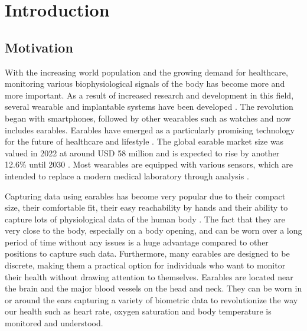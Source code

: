 \chapter{Introduction}
\label{ch:Introduction}

\section{Motivation}
\label{ch:Introduction:Motivation}
With the increasing world population and the growing demand for healthcare, monitoring various biophysiological signals of the body has become more and more important. 
As a result of increased research and development in this field, several wearable and implantable systems have been developed \cite{loncar-turukaloLiteratureWearableTechnology2019}.
The revolution began with smartphones, followed by other wearables such as watches and now includes earables.
Earables have emerged as a particularly promising technology for the future of healthcare and lifestyle \cite{trespGoingDigitalSurvey2016, kirkWearablesRevolutionStandardization2014a}. 
The global earable market size was valued in 2022 at around USD 58 million and is expected to rise by another 12.6\% until 2030 \cite{GlobalEarphonesHeadphones2018}.
Most wearables are equipped with various sensors, which are intended to replace a modern medical laboratory through analysis \cite{loncar-turukaloLiteratureWearableTechnology2019}.

Capturing data using earables has become very popular due to their compact size, their comfortable fit, their easy reachability by hands and their ability to capture lots of physiological data of the human body \cite{roddigerSensingEarablesSystematic2022a}. 
The fact that they are very close to the body, especially on a body opening, and can be worn over a long period of time without any issues is a huge advantage compared to other positions to capture such data.
Furthermore, many earables are designed to be discrete, making them a practical option for individuals who want to monitor their health without drawing attention to themselves.
Earables are located near the brain and the major blood vessels on the head and neck.
They can be worn in or around the ears capturing a variety of biometric data to revolutionize the way our health such as heart rate, oxygen saturation and body temperature is monitored and understood.

